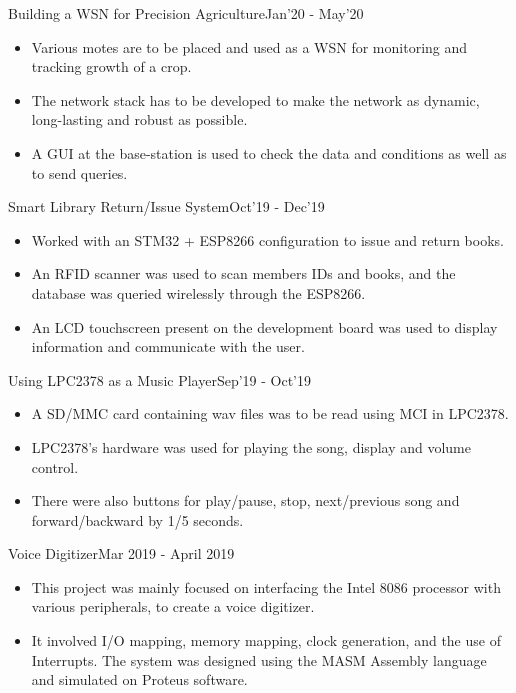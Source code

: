 \begin{projects}

\project
	{Building a WSN for Precision Agriculture}{Jan'20 - May'20}
	{}
	{\begin{itemize}
	\setlength\itemsep{0.3em}
    \item Various motes are to be placed and used as a WSN for monitoring and tracking growth of a crop.
    \item The network stack has to be developed to make the network as dynamic, long-lasting and robust as possible.
    \item A GUI at the base-station is used to check the data and conditions as well as to send queries.
     \end{itemize}}
     
\project
	{Smart Library Return/Issue System}{Oct'19 - Dec'19}
	{}
	{\begin{itemize}
	\setlength\itemsep{0.3em}
    \item Worked with an STM32 + ESP8266 configuration to issue and return books.
    \item An RFID scanner was used to scan members IDs and books, and the database was queried wirelessly through the ESP8266.
    \item An LCD touchscreen  present on the development board was used to display information and communicate with the user.
     \end{itemize}}
     
\project
	{Using LPC2378 as a Music Player}{Sep'19 - Oct'19}
	{}
	{\begin{itemize}
	\setlength\itemsep{0.3em}
    \item A SD/MMC card containing wav files was to be read using MCI in LPC2378.
    \item LPC2378's hardware was used for playing the song, display and volume control.
    \item There were also buttons for play/pause, stop, next/previous song and forward/backward by 1/5 seconds.
     \end{itemize}}
     
\project
    {Voice Digitizer}{Mar 2019 - April 2019}
    {}
    {\begin{itemize}
	\setlength\itemsep{0.3em}
    \item This project was mainly focused on interfacing the Intel 8086 processor with various peripherals, to create a voice digitizer.
    \item It involved I/O mapping, memory mapping, clock generation, and the use of Interrupts. The system was designed using the MASM Assembly language and simulated on Proteus software.
     \end{itemize}}
 \end{projects}    
\vspace{-3mm}


